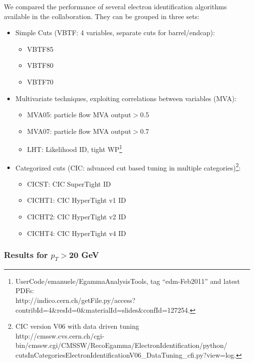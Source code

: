 We compared the performance of several electron identification algorithms available in the collaboration.
They can be grouped in three sets:
\begin{itemize}
\item Simple Cuts (VBTF: 4 variables, separate cuts for barrel/endcap): 
  \begin{itemize}
  \item VBTF85
  \item VBTF80 
  \item VBTF70
  \end{itemize}
\item Multivariate techniques, exploiting correlations between variables (MVA): 
  \begin{itemize}
  \item MVA05: particle flow MVA output$>$0.5 
  \item MVA07: particle flow MVA output$>$0.7 
  \item LHT: Likelihood ID, tight WP\footnote{UserCode/emanuele/EgammaAnalysisTools, tag ``edm-Feb2011'' and latest PDFs: \\
http://indico.cern.ch/getFile.py/access?contribId=4\&resId=0\&materialId=slides\&confId=127254.}
  \end{itemize}
\item Categorized cuts (CIC: advanced cut based tuning in multiple categories)\footnote{CIC version V06 with data driven tuning \\
http://cmssw.cvs.cern.ch/cgi-bin/cmssw.cgi/CMSSW/RecoEgamma/ElectronIdentification/python/\\
cutsInCategoriesElectronIdentificationV06\_DataTuning\_cfi.py?view=log.}: 
  \begin{itemize}
  \item CICST: CIC SuperTight ID 
  \item CICHT1: CIC HyperTight v1 ID 
  \item CICHT2: CIC HyperTight v2 ID
  \item CICHT4: CIC HyperTight v4 ID
  \end{itemize}
\end{itemize}

\subsubsection{Results for $p_T>$20 GeV}

